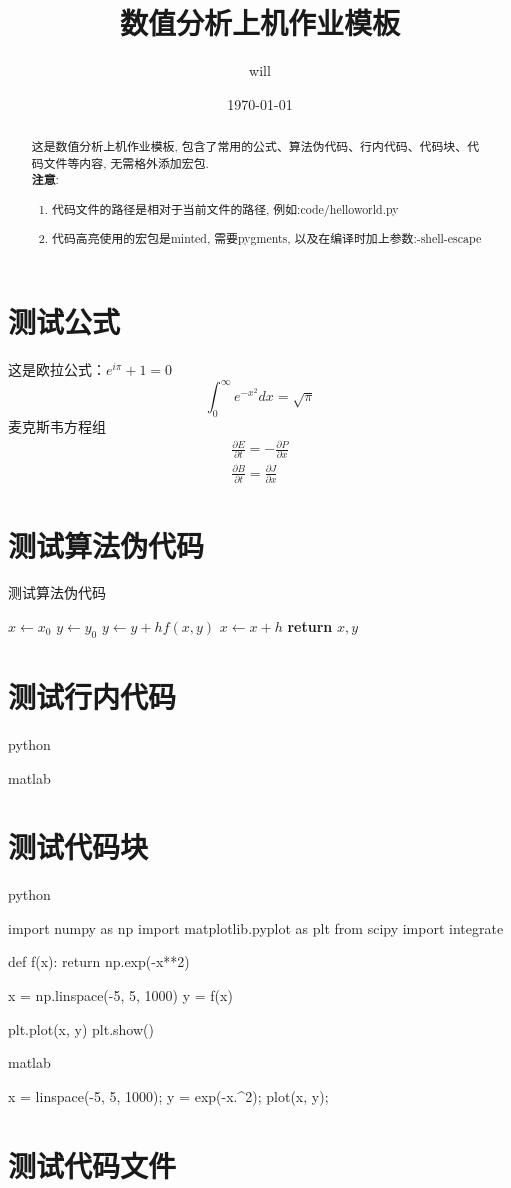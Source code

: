 \documentclass[11pt,a4paper]{TGNA}
\title{\textbf{数值分析上机作业模板}}
\author{will}
\date{\small\normalfont\today}
\begin{document}
\maketitle
\begin{abstract}
    这是数值分析上机作业模板, 包含了常用的公式、算法伪代码、行内代码、代码块、代码文件等内容, 无需格外添加宏包.\\
    \textbf{注意}:
    \begin{enumerate}
        \item 代码文件的路径是相对于当前文件的路径, 例如:code/helloworld.py
        \item 代码高亮使用的宏包是minted, 需要pygments, 以及在编译时加上参数:-shell-escape
    \end{enumerate}
\end{abstract}
\section{测试公式}
这是欧拉公式：$e^{i\pi}+1=0$
$$
\int_{0}^{\infty} e^{-x^2} dx = \sqrt{\pi}
$$
麦克斯韦方程组
$$
\begin{aligned}
    \frac{\partial E}{\partial t} = -\frac{\partial P}{\partial x} \\
\frac{\partial B}{\partial t} = \frac{\partial J}{\partial x}
\end{aligned}
$$

\section{测试算法伪代码}
\begin{algorithm}
\caption{测试算法伪代码}
\begin{algorithmic}
\State $x \leftarrow x_0$
\State $y \leftarrow y_0$
\State $y \leftarrow y + h f(x, y)$
\State $x \leftarrow x + h$
\EndFor
\State \textbf{return} $x, y$
\end{algorithmic}
\end{algorithm}
\section{测试行内代码}
python\\

matlab\\

\section{测试代码块}
python
\begin{pythoncode}
import numpy as np
import matplotlib.pyplot as plt
from scipy import integrate

def f(x):
    return np.exp(-x**2)

x = np.linspace(-5, 5, 1000)
y = f(x)

plt.plot(x, y)
plt.show()
\end{pythoncode}

matlab
\begin{matlabcode}
x = linspace(-5, 5, 1000);
y = exp(-x.^2);
plot(x, y);
\end{matlabcode}

\section{测试代码文件}

\end{document}
